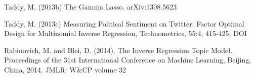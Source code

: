 \documentclass[12pt]{article}
\begin{document}
\begin{thebibliography}{99}
 Taddy, M.  (2013b) The Gamma Lasso. arXiv:1308.5623

  Taddy, M.  (2013c) Measuring Political Sentiment on Twitter: Factor Optimal Design for Multinomial Inverse Regression, Technometrics, 55:4, 415-425, DOI

 Rabinovich, M. and Blei, D. (2014). The Inverse Regression Topic Model. Proceedings of the 31st International Conference on Machine Learning, Beijing, China, 2014. JMLR: W\&CP volume 32







\end{thebibliography}
\end{document}

